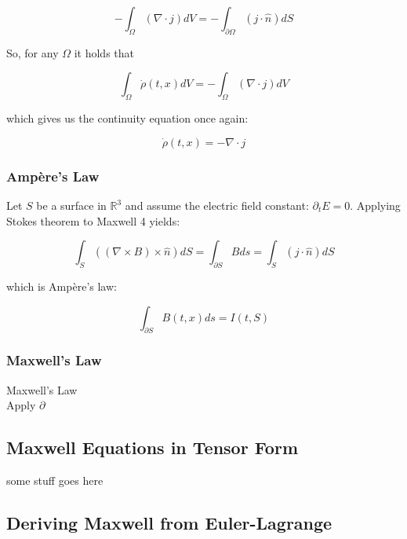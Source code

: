 \documentclass{article}
\begin{document}
\begin{equation} \label{qchange1}
- \int_{\Omega} (\nabla \cdot j) dV = - \int_{\partial \Omega} (j \cdot \hat{n}) dS
\end{equation}

So, for any $\Omega$ it holds that 

\begin{equation} \label{qchange2}
 \int_{\Omega} \dot \rho(t, x) dV = - \int_{\Omega} (\nabla \cdot j) dV
\end{equation}

which gives us the continuity equation once again:

\begin{equation} \label{qchange3}
\dot \rho(t, x) = - \nabla \cdot j
\end{equation}

\subsubsection{Ampère's Law}

Let $S$ be a surface in $\mathbb{R}^3$ and assume the electric field constant: $\partial_t E = 0$.
Applying Stokes theorem to Maxwell 4 yields:
 
\begin{equation} \label{ampere0}
\int_S ((\nabla \times B) \times \hat n) dS = \int_{\partial S} B ds
= \int_S (j \cdot \hat n) dS
\end{equation}

which is Ampère's law:

\begin{equation} \label{ampere}
\int_{\partial S} B(t, x) ds = I(t, S)
\end{equation}



\subsubsection{Maxwell's Law}
Maxwell's Law \\
Apply $\partial$

\subsection{Maxwell Equations in Tensor Form}

some stuff goes here

\subsection{Deriving Maxwell from Euler-Lagrange}
\end{document}

